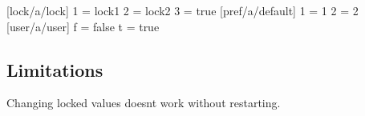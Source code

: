 \begin{DoxyCode}
\end{DoxyCode}





\begin{DoxyCode}

[lock/a/lock]
1 = lock1
2 = lock2
3 = true
[pref/a/default]
1 = 1
2 = 2
[user/a/user]
f = false
t = true
\end{DoxyCode}




\subsection*{Limitations}

Changing locked values doesn\textquotesingle{}t work without restarting. 